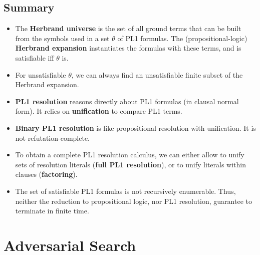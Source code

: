 \documentclass[conference, a4paper]{styles/acmsiggraph}
\begin{document}
    \subsection{Summary}
        \begin{itemize}
            \item The \textbf{Herbrand universe} is the set of all ground terms that can be built from the symbols used in a set $\theta$ of PL1 formulas. 
                The (propositional-logic) \textbf{Herbrand expansion} instantiates the formulas with these terms, and is satisfiable iff $\theta$ is.
            \item For unsatisfiable $\theta$, we can always find an unsatisfiable finite subset of the Herbrand expansion.
            \item \textbf{PL1 resolution} reasons directly about PL1 formulas (in clausal normal form).
                It relies on \textbf{unification} to compare PL1 terms.
            \item \textbf{Binary PL1 resolution} is like propositional resolution with unification. 
                It is not refutation-complete.
            \item To obtain a complete PL1 resolution calculus, we can either allow to unify sets of resolution literals (\textbf{full PL1 resolution}), or to unify literals within clauses (\textbf{factoring}).
            \item The set of satisfiable PL1 formulas is not recursively enumerable. 
                Thus, neither the reduction to propositional logic, nor PL1 resolution, guarantee to terminate in finite time.
        \end{itemize}

        
    
    
    
    
    
    
    



\section{Adversarial Search}
\end{document}
